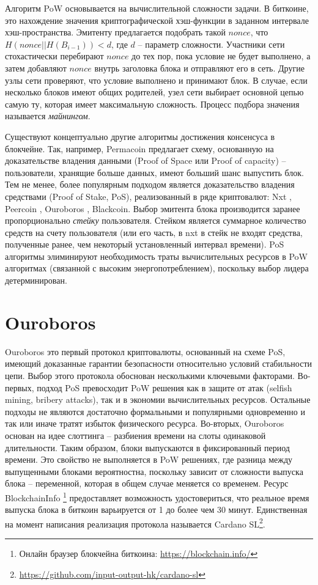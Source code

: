 \documentclass[specification,annotation]{itmo-student-thesis}
\begin{document}
Алгоритм PoW основывается на вычислительной сложности задачи. В
биткоине, это нахождение значения криптографической хэш-функции в
заданном интервале хэш-пространства. Эмитенту предлагается подобрать
такой $nonce$, что $H(nonce || H(B_{i-1})) < d$, где $d$ -- параметр
сложности. Участники сети стохастически перебирают $nonce$ до тех пор,
пока условие не будет выполнено, а затем добавляют $nonce$ внутрь
заголовка блока и отправляют его в сеть. Другие узлы сети проверяют,
что условие выполнено и принимают блок. В случае, если несколько
блоков имеют общих родителей, узел сети выбирает основной цепью самую
ту, которая имеет максимальную сложность. Процесс подбора значения
называется {\it майнингом}.

Существуют концептуально другие алгоритмы достижения консенсуса в
блокчейне. Так, например, Permacoin \cite{permacoin} предлагает схему,
основанную на доказательстве владения данными (Proof of Space или
Proof of capacity) -- пользователи, хранящие больше данных, имеют
больший шанс выпустить блок. Тем не менее, более популярным подходом
является доказательство владения средствами (Proof of Stake, PoS),
реализованный в ряде криптовалют: Nxt \cite{nxt}, Peercoin
\cite{king2012ppcoin}, Ouroboros \cite{ouroboros}, Blackcoin. Выбор
эмитента блока производится заранее пропорционально {\it стейку}
пользователя. Стейком является суммарное количество средств на счету
пользователя (или его часть, в nxt в стейк не входят средства,
полученные ранее, чем некоторый установленный интервал времени). PoS
алгоритмы элиминируют необходимость траты вычислительных ресурсов в
PoW алгоритмах (связанной с высоким энергопотреблением), поскольку
выбор лидера детерминирован.

\section{Ouroboros}

Ouroboros \cite{ouroboros} это первый протокол криптовалюты,
основанный на схеме PoS, имеющий доказанные гарантии безопасности
относительно условий стабильности цепи. Выбор этого протокола
обоснован несколькими ключевыми факторами. Во-первых, подход PoS
превосходит PoW решения как в защите от атак (selfish mining, bribery
attacks), так и в экономии вычислительных ресурсов. Остальные подходы
не являются достаточно формальными и популярными одновременно и так
или иначе тратят избыток физического ресурса. Во-вторых, Ouroboros
основан на идее слоттинга -- разбиения времени на слоты одинаковой
длительности. Таким образом, блоки выпускаются в фиксированный период
времени. Это свойство не выполняется в PoW решениях, где разница между
выпущенными блоками вероятностна, поскольку зависит от сложности
выпуска блока -- переменной, которая в общем случае меняется со
временем. Ресурс BlockchainInfo \footnote{Онлайн браузер блокчейна
  биткоина: \url{https://blockchain.info/}} предоставляет возможность
удостовериться, что реальное время выпуска блока в биткоин варьируется
от 1 до более чем 30 минут. Единственная на момент написания
реализация протокола называется Cardano
SL\footnote{\url{https://github.com/input-output-hk/cardano-sl}}.
\end{document}
